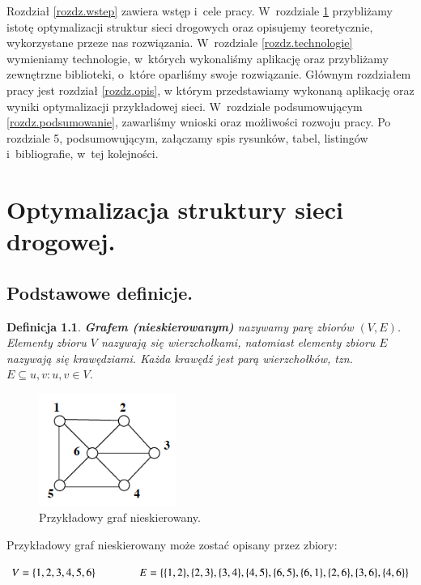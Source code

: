 \documentclass[twoside,12pt]{report}
\let\oldsection\chapter
\def\chapter{\cleardoublepage\oldsection}
\newtheorem{definition}{Definicja} %
\begin{document}
Rozdział \ref{rozdz.wstep} zawiera wstęp i~cele pracy. W~rozdziale \ref{rozdz.optymalizacja} przybliżamy istotę optymalizacji struktur sieci drogowych
oraz opisujemy teoretycznie, wykorzystane przeze nas rozwiązania. W~rozdziale \ref{rozdz.technologie} wymieniamy technologie, w~których wykonaliśmy aplikację oraz przybliżamy zewnętrzne biblioteki, o~które oparliśmy swoje rozwiązanie. Głównym rozdziałem pracy jest rozdział \ref{rozdz.opis},
w którym przedstawiamy wykonaną aplikację oraz wyniki optymalizacji przykładowej sieci. W~rozdziale podsumowującym \ref{rozdz.podsumowanie}, zawarliśmy wnioski oraz możliwości rozwoju pracy. Po rozdziale 5, podsumowującym, załączamy spis rysunków, tabel, listingów i~bibliografie, w~tej kolejności.

\chapter{Optymalizacja struktury sieci drogowej.}\label{rozdz.optymalizacja} 
\section{Podstawowe definicje.}

\begin{definition}\label{Graf nieskierowany}
\textbf{Grafem (nieskierowanym)} nazywamy parę zbiorów $(V,E)$. Elementy zbioru $V$ nazywają się \textit{wierzchołkami}, natomiast elementy zbioru $E$ nazywają się \textit{krawędziami}. Każda krawędź jest parą wierzchołków, tzn. $E \subseteq {{u,v}:u,v \in V}$\cite{grafy}.
\end{definition}

\begin{figure}[ht]
\begin{center}
\includegraphics[width=0.40\textwidth]{img/graf1}
\caption{Przykładowy graf nieskierowany.} 
\end{center}
\end{figure}

Przykładowy graf nieskierowany może zostać opisany przez zbiory:
\begin{center}
\begin{math}
V=\{1,2,3,4,5,6\} \hspace*{40px} E=\{\{1,2\},\{2,3\},\{3,4\},\{4,5\},\{6,5\},\{6,1\},\{2,6\},\{3,6\},\{4,6\}\}
\end{math}
\end{center}
\end{document}
